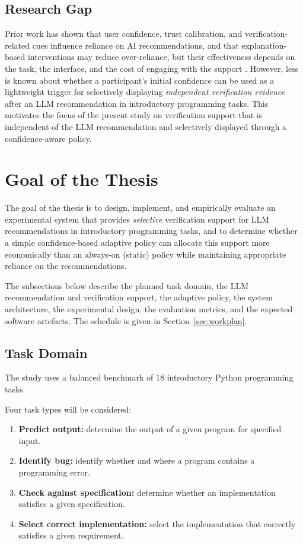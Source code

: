 \documentclass[oneside,final,14pt,a4paper]{extreport}
\theoremstyle{definition}
\theoremstyle{remark}
\begin{document}
\subsection{Research Gap}
Prior work has shown that user confidence, trust calibration, and
verification-related cues influence reliance on AI recommendations, and that
explanation-based interventions may reduce over-reliance, but their
effectiveness depends on the task, the interface, and the cost of engaging with
the support \cite{Vasconcelos2023}. However, less is known about whether a
participant's initial confidence can be used as a lightweight trigger for
selectively displaying \emph{independent verification evidence} after an LLM
recommendation in introductory programming tasks. This motivates the focus of
the present study on verification support that is independent of the LLM
recommendation and selectively displayed through a confidence-aware policy.

\section{Goal of the Thesis}

The goal of the thesis is to design, implement, and empirically evaluate an
experimental system that provides \emph{selective} verification support for LLM
recommendations in introductory programming tasks, and to determine whether a
simple confidence-based adaptive policy can allocate this support more
economically than an always-on (static) policy while maintaining appropriate
reliance on the recommendations.

The subsections below describe the planned task domain, the LLM recommendation
and verification support, the adaptive policy, the system architecture, the
experimental design, the evaluation metrics, and the expected software
artefacts. The schedule is given in Section~\ref{sec:workplan}.

\subsection{Task Domain}
The study uses a balanced benchmark of 18 introductory Python programming
tasks.

Four task types will be considered:
\begin{enumerate}
    \item \textbf{Predict output:} determine the output of a given program for
    specified input.
    \item \textbf{Identify bug:} identify whether and where a program contains
    a programming error.
    \item \textbf{Check against specification:} determine whether an
    implementation satisfies a given specification.
    \item \textbf{Select correct implementation:} select the implementation
    that correctly satisfies a given requirement.
\end{enumerate}
\end{document}
